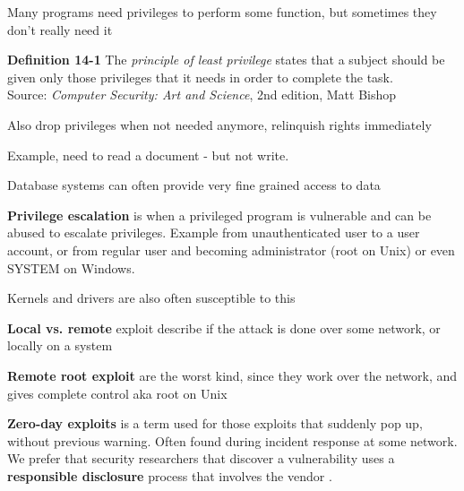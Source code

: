 \documentclass[Screen16to9,17pt]{foils}
\begin{document}

\begin{list1}
\item Many programs need privileges to perform some function, but sometimes they don't really need it
\item {\bf Definition 14-1} The \emph{principle of least privilege} states that a subject should be given only those privileges that it needs in order to complete the task.\\
Source:  \emph{Computer Security: Art and Science}, 2nd edition, Matt Bishop

\item Also drop privileges when not needed anymore, relinquish rights immediately
\item Example, need to read a document - but not write.
\item Database systems can often provide very fine grained access to data
\end{list1}

\begin{list1}
\item {\bfseries Privilege escalation} is when a privileged program is vulnerable and can be abused to escalate privileges. Example from unauthenticated user to a user account, or from regular user and becoming administrator (root on Unix) or even SYSTEM on Windows.
\item Kernels and drivers are also often susceptible to this
\end{list1}


\begin{list1}
\item {\bfseries Local vs. remote} exploit describe if the attack is done over some network, or locally on a system
\item {\bfseries Remote root exploit}
are the worst kind, since they work over the network, and gives complete control aka root on Unix
\item {\bfseries Zero-day exploits} is a term used for those exploits that suddenly pop up, without previous warning. Often found during incident response at some network. We prefer that security researchers that discover a vulnerability uses a {\bf responsible disclosure} process that involves the vendor .
\end{list1}
\end{document}
